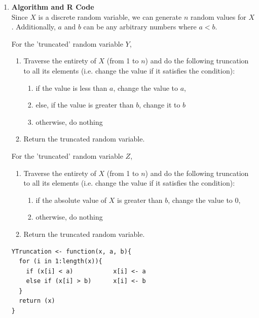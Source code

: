 \documentclass[12pt,letterpaper]{article}
\begin{document}
    \begin{enumerate}[label=\Alph*]
      \vspace*{0.5cm}
      \item \textbf{Algorithm and R Code}\\
        Since $X$ is a discrete random variable, we can generate $n$ random values for $X$. Additionally, $a$ and $b$ can be any arbitrary numbers where $a < b$. 

        \vspace*{0.5cm}
        For the 'truncated' random variable $Y$,
        \begin{enumerate}[label=\arabic*.]
          \item Traverse the entirety of $X$ (from 1 to $n$) and do the following truncation to all its elements (i.e. change the value if it satisfies the condition):
            \begin{enumerate}[label=1.\arabic*.]
              \item if the value is less than $a$, change the value to $a$,
              \item else, if the value is greater than $b$, change it to $b$
              \item otherwise, do nothing
            \end{enumerate}
          \item Return the truncated random variable.
        \end{enumerate}

        \vspace*{0.5cm}
        For the 'truncated' random variable $Z$,
        \begin{enumerate}[label=\arabic*.]
          \item Traverse the entirety of $X$ (from 1 to $n$) and do the following truncation to all its elements (i.e. change the value if it satisfies the condition):
            \begin{enumerate}[label=1.\arabic*.]
              \item if the absolute value of $X$ is greater than $b$, change the value to 0,
              \item otherwise, do nothing
            \end{enumerate}
          \item Return the truncated random variable.
        \end{enumerate}
        \newpage
        \begin{lstlisting}[title=\footnotesize Code 1.1: Function for the truncation of $Y$ and $Z$]
YTruncation <- function(x, a, b){
  for (i in 1:length(x)){
    if (x[i] < a)           x[i] <- a
    else if (x[i] > b)      x[i] <- b
  }
  return (x)
}


\end{lstlisting}
\end{enumerate}
\end{document}
